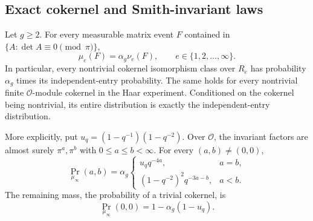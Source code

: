 \subsection{Exact cokernel and Smith-invariant laws}

\begin{corollary}
\label{cor:padic-cokernel}
Let $g\geq2$. For every measurable matrix event $F$ contained in
$\{A:\det A\equiv0\pmod\pi\}$,
\begin{equation}\label{eq:padic-singular-scaling}
 \mu_e(F)=\alpha_g\nu_e(F),
 \qquad e\in\{1,2,\ldots,\infty\}.
\end{equation}
In particular, every nontrivial cokernel isomorphism class over $R_e$
has probability $\alpha_g$ times its independent-entry probability.
The same holds for every nontrivial finite $\mathcal O$-module
cokernel in the Haar experiment. Conditioned on the cokernel being
nontrivial, its entire distribution is exactly the independent-entry
distribution.

More explicitly, put $u_q=(1-q^{-1})(1-q^{-2})$. Over $\mathcal O$,
the invariant factors are almost surely $\pi^a,\pi^b$ with
$0\leq a\leq b<\infty$. For every $(a,b)\ne(0,0)$,
\begin{equation}\label{eq:padic-smith-prob}
 \Pr_{\mu_\infty}(a,b)=\alpha_g
 \begin{cases}
 u_q q^{-4a},&a=b,\\
 (1-q^{-2})^2q^{-3a-b},&a<b.
 \end{cases}
\end{equation}
The remaining mass, the probability of a trivial cokernel, is
\begin{equation}\label{eq:padic-trivial-coker}
 \Pr_{\mu_\infty}(0,0)=1-\alpha_g(1-u_q).
\end{equation}
\end{corollary}

